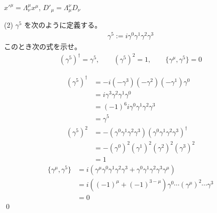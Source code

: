\documentclass[uplatex,dvipdfmx,a4paper,11pt]{jlreq}
\makeatletter
\numberwithin{equation}{section}
\theoremstyle{definition}
\renewenvironment{proof}[1][\proofname]{\par
  \normalfont
  \topsep6\p@\@plus6\p@ \trivlist
  \item[\hskip\labelsep{\bfseries #1}\@addpunct{\bfseries}]\ignorespaces\quad\par
}{%
  \qed\endtrivlist\@endpefalse
}
\renewcommand\proofname{証明}
\makeatother
\begin{document}
\begin{proposition}
  $x'^\mu = \Lambda^\mu_\nu x^\mu$, $D'_\mu = \Lambda_\mu^\nu D_\nu$
\end{proposition}

(2) $\gamma^5$ を次のように定義する。
\begin{align}
  \gamma^5 := i\gamma^0\gamma^1\gamma^2\gamma^3
\end{align}
このとき次の式を示せ。
\begin{align}
  (\gamma^5)^\dagger = \gamma^5, \qquad (\gamma^5)^2 = 1, \qquad \lbrace\gamma^\mu, \gamma^5\rbrace = 0
\end{align}
\begin{proof}
  \begin{align}
    (\gamma^5)^\dagger & = -i(-\gamma^3)(-\gamma^2)(-\gamma^1)\gamma^0                                   \\
                       & = i\gamma^3\gamma^2\gamma^1\gamma^0                                             \\
                       & = (-1)^6i\gamma^0\gamma^1\gamma^2\gamma^3                                       \\
                       & = \gamma^5                                                                      \\
    (\gamma^5)^2       & = -(\gamma^0\gamma^1\gamma^2\gamma^3)(\gamma^0\gamma^1\gamma^2\gamma^3)^\dagger \\
                       & = - (\gamma^0)^2(\gamma^1)^2(\gamma^2)^2(\gamma^3)^2                            \\
                       & = 1
  \end{align}
  \begin{align}
    \lbrace\gamma^\mu, \gamma^5\rbrace & = i(\gamma^\mu\gamma^0\gamma^1\gamma^2\gamma^3 + \gamma^0\gamma^1\gamma^2\gamma^3\gamma^\mu) \\
                                       & = i((-1)^\mu + (-1)^{3-\mu})\gamma^0\cdots(\gamma^\mu)^2\cdots\gamma^3                       \\
                                       & = 0
  \end{align}
\end{proof}
\end{document}
